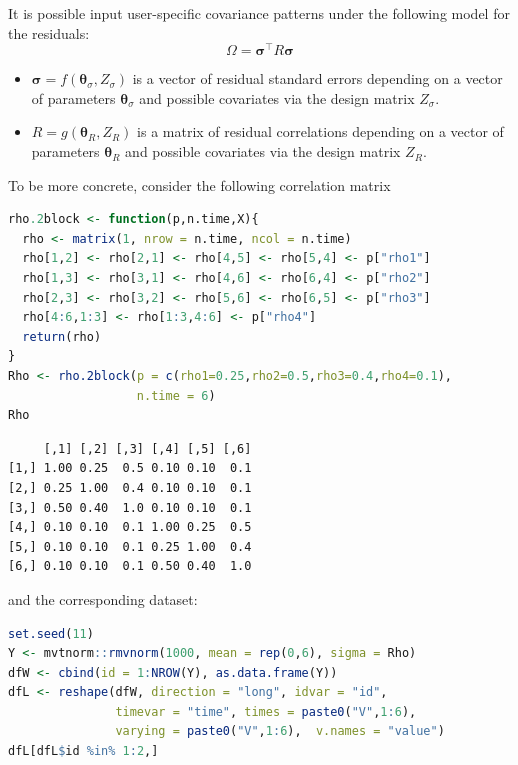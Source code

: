 \documentclass[12pt]{article}
\newcommand\trans[1]{{#1}^\intercal}%
\begin{document}
It is possible input user-specific covariance patterns under the
following model for the residuals: \[\Omega =
\trans{\boldsymbol{\sigma}} R \boldsymbol{\sigma}\]
\begin{itemize}
\item \(\boldsymbol{\sigma}=f(\boldsymbol{\theta}_{\sigma},Z_{\sigma})\)
is a vector of residual standard errors depending on a vector of
parameters \(\boldsymbol{\theta}_{\sigma}\) and possible covariates
via the design matrix \(Z_{\sigma}\).
\item \(R=g(\boldsymbol{\theta}_{R},Z_R)\) is a matrix of residual
correlations depending on a vector of parameters
\(\boldsymbol{\theta}_{R}\) and possible covariates via the design
matrix \(Z_R\).
\end{itemize}

\bigskip

To be more concrete, consider the following correlation matrix
\begin{lstlisting}[language=r,numbers=none]
rho.2block <- function(p,n.time,X){
  rho <- matrix(1, nrow = n.time, ncol = n.time)
  rho[1,2] <- rho[2,1] <- rho[4,5] <- rho[5,4] <- p["rho1"]
  rho[1,3] <- rho[3,1] <- rho[4,6] <- rho[6,4] <- p["rho2"]
  rho[2,3] <- rho[3,2] <- rho[5,6] <- rho[6,5] <- p["rho3"]
  rho[4:6,1:3] <- rho[1:3,4:6] <- p["rho4"]
  return(rho)
}
Rho <- rho.2block(p = c(rho1=0.25,rho2=0.5,rho3=0.4,rho4=0.1),
                  n.time = 6)
Rho
\end{lstlisting}

\label{}
\begin{verbatim}
     [,1] [,2] [,3] [,4] [,5] [,6]
[1,] 1.00 0.25  0.5 0.10 0.10  0.1
[2,] 0.25 1.00  0.4 0.10 0.10  0.1
[3,] 0.50 0.40  1.0 0.10 0.10  0.1
[4,] 0.10 0.10  0.1 1.00 0.25  0.5
[5,] 0.10 0.10  0.1 0.25 1.00  0.4
[6,] 0.10 0.10  0.1 0.50 0.40  1.0
\end{verbatim}


and the corresponding dataset:
\begin{lstlisting}[language=r,numbers=none]
set.seed(11)
Y <- mvtnorm::rmvnorm(1000, mean = rep(0,6), sigma = Rho)
dfW <- cbind(id = 1:NROW(Y), as.data.frame(Y))
dfL <- reshape(dfW, direction = "long", idvar = "id",
               timevar = "time", times = paste0("V",1:6),
               varying = paste0("V",1:6),  v.names = "value")
dfL[dfL$id %in% 1:2,]
\end{lstlisting}
\end{document}

